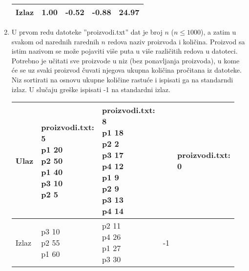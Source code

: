 \begin{enumerate}
\begin{tabular}{ |l|l|l|l|l| }
  Izlaz & 1.00 & -0.52 & -0.88 & 24.97 \\ \hline

\end{tabular}

\normalsize



\item U prvom redu datoteke ''proizvodi.txt'' dat je broj $n$ ($n \le 1000$), a zatim u svakom od narednih rarednih $n$ redova naziv proizvoda i koli\v cina. Proizvod sa istim nazivom se mo\v ze pojaviti vi\v se puta u vi\v se razli\v citih redova u datoteci. Potrebno je u\v citati sve proizvode u niz (bez ponavljanja proizvoda), u kome \' ce se uz svaki proizvod \v cuvati njegova ukupna koli\v cina pro\v citana iz datoteke. Niz sortirati na osnovu ukupne koli\v cine rastu\' ce i ispisati ga na standarndi izlaz.  U slu\v caju gre\v ske ispisati -1 na standardni izlaz.



\small

\begin{tabular}{ |l|l|l|l|l| }

\hline

  Ulaz &

  \mlcell{proizvodi.txt:\\5\\p1 20\\p2 50\\p1 40\\p3 10\\p2 5}&\mlcell{proizvodi.txt:\\8\\p1 18 \\ p2 2 \\ p3 17 \\ p4 12 \\ p1 9 \\ p2 9 \\ p3 13 \\ p4 14} & \mlcell{}&

  \mlcell{proizvodi.txt:\\0} \\ \hline

  Izlaz &\mlcell{p3 10\\p2 55\\p1 60}& \mlcell{p2 11 \\ p4 26 \\ p1 27 \\ p3 30} & -1 & \\ \hline

\end{tabular}

\normalsize
\end{enumerate}





